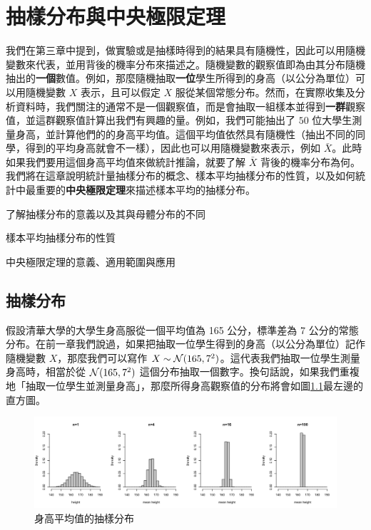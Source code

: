 \chapter{抽樣分布與中央極限定理}
    我們在第三章中提到，做實驗或是抽樣時得到的結果具有隨機性，因此可以用隨機變數來代表，並用背後的機率分布來描述之。隨機變數的觀察值即為由其分布隨機抽出的\textbf{一個}數值。例如，那麼隨機抽取\textbf{一位}學生所得到的身高（以公分為單位）可以用隨機變數 $X$ 表示，且可以假定 $X$ 服從某個常態分布。然而，在實際收集及分析資料時，我們關注的通常不是一個觀察值，而是會抽取一組樣本並得到\textbf{一群}觀察值，並這群觀察值計算出我們有興趣的量。例如，我們可能抽出了 $50$ 位大學生測量身高，並計算他們的的身高平均值。這個平均值依然具有隨機性（抽出不同的同學，得到的平均身高就會不一樣），因此也可以用隨機變數來表示，例如 $\bar{X}$。此時如果我們要用這個身高平均值來做統計推論，就要了解 $\bar{X}$ 背後的機率分布為何。我們將在這章說明統計量抽樣分布的概念、樣本平均抽樣分布的性質，以及如何統計中最重要的\textbf{中央極限定理}來描述樣本平均的抽樣分布。
    
    \begin{introduction}
        \item 了解抽樣分布的意義以及其與母體分布的不同
        \item 樣本平均抽樣分布的性質
        \item 中央極限定理的意義、適用範圍與應用
    \end{introduction}

\section{抽樣分布}
    假設清華大學的大學生身高服從一個平均值為 165 公分，標準差為 7 公分的常態分布。在前一章我們說過，如果把抽取一位學生得到的身高（以公分為單位）記作隨機變數 $X$，那麼我們可以寫作 $X \sim \mathcal{N}(165, 7^2)$。這代表我們抽取一位學生測量身高時，相當於從 $\mathcal{N}(165,7^2)$ 這個分布抽取一個數字。換句話說，如果我們重複地「抽取一位學生並測量身高」，那麼所得身高觀察值的分布將會如圖\ref{fig:sampling_mean}最左邊的直方圖。

    \begin{figure}[htbp]
        \centering
        \includegraphics[width=\textwidth]{figures/04-Sampling_distribution_CLT/sampling_mean.png}
        \caption{身高平均值的抽樣分布}
        \label{fig:sampling_mean}
    \end{figure}

